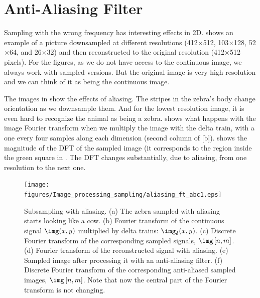 \section{Anti-Aliasing Filter}

Sampling with the wrong frequency has interesting effects in 2D.  shows an example of a picture downsampled at different resolutions (412$\times$512, 103$\times$128, 52$\times$64, and 26$\times$32) and then reconstructed to the original resolution (412$\times$512 pixels). For the figures, as we do not have access to the continuous image, we always work with sampled versions. But the original image is very high resolution and we can think of it as being the continuous image.


The images in  show the effects of aliasing. The stripes in the zebra's body change orientation as we downsample them. And for the lowest resolution image, it is even hard to recognize the animal as being a zebra.  shows what happens with the image Fourier transform when we multiply the image with the delta train, with a one every four samples along each dimension (second column of \fig{\ref{fig:aliasingFTzebra}}[b]).  shows the magnitude of the DFT of the sampled image (it corresponds to the region inside the green square in . The DFT changes substantially, due to aliasing, from one resolution to the next one.


%
\begin{figure}[t]
    \texttt{[image: figures/Image\_processing\_sampling/aliasing\_ft\_abc1.eps]}
    \caption{Subsampling with aliasing. (a) The zebra sampled with aliasing starts looking like a cow. (b) Fourier transform of the continuous signal $\img(x,y)$ multiplied by delta trains: $\img_{\delta}(x,y)$. (c) Discrete Fourier transform of the corresponding sampled signals, $\img\left[n,m\right]$. (d) Fourier transform of the reconstructed signal with aliasing. (e) Sampled image after processing it with an anti-aliasing filter. (f) Discrete Fourier transform of the corresponding anti-aliased sampled images, $\img\left[n,m\right]$. Note that now the central part of the Fourier transform is not changing.
    }
    \label{fig:aliasingFTzebra}
\end{figure}


